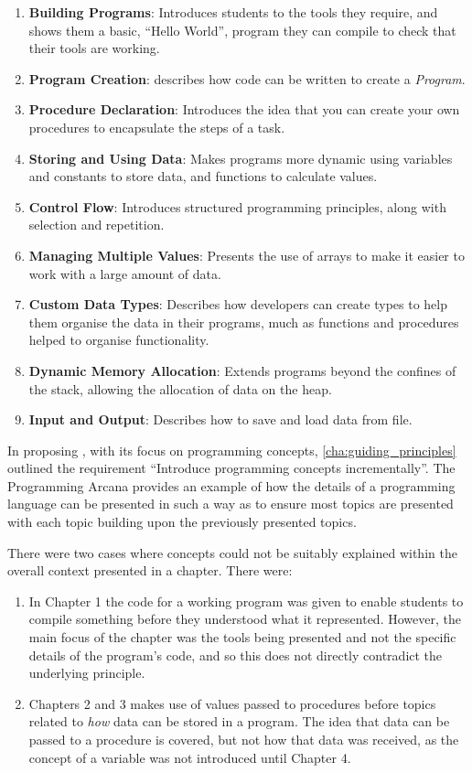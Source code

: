 \begin{enumerate}
  \item \textbf{Building Programs}: Introduces students to the tools they require, and shows them a basic, ``Hello World'', program they can compile to check that their tools are working.
  \item \textbf{Program Creation}: describes how code can be written to create a \emph{Program}.
  \item \textbf{Procedure Declaration}: Introduces the idea that you can create your own procedures to encapsulate the steps of a task. 
  \item \textbf{Storing and Using Data}: Makes programs more dynamic using variables and constants to store data, and functions to calculate values.
  \item \textbf{Control Flow}: Introduces structured programming principles, along with selection and repetition.
  \item \textbf{Managing Multiple Values}: Presents the use of arrays to make it easier to work with a large amount of data.
  \item \textbf{Custom Data Types}: Describes how developers can create types to help them organise the data in their programs, much as functions and procedures helped to organise functionality.
  \item \textbf{Dynamic Memory Allocation}: Extends programs beyond the confines of the stack, allowing the allocation of data on the heap.
  \item \textbf{Input and Output}: Describes how to save and load data from file.
\end{enumerate}

In proposing , with its focus on programming concepts, \cref{cha:guiding_principles} outlined the requirement ``Introduce programming concepts incrementally''. The Programming Arcana provides an example of how the details of a programming language can be presented in such a way as to ensure most topics are presented with each topic building upon the previously presented topics. 

\clearpage
There were two cases where concepts could not be suitably explained within the overall context presented in a chapter. There were:
\begin{enumerate}
  \item In Chapter 1 the code for a working program was given to enable students to compile something before they understood what it represented. However, the main focus of the chapter was the tools being presented and not the specific details of the program's code, and so this does not directly contradict the underlying principle. 
  \item Chapters 2 and 3 makes use of values passed to procedures before topics related to \emph{how} data can be stored in a program. The idea that data can be passed to a procedure is covered, but not how that data was received, as the concept of a variable was not introduced until Chapter 4.
\end{enumerate}

